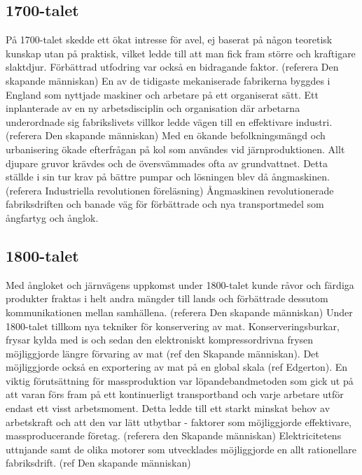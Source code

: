 \subsection{1700-talet}
På 1700-talet skedde ett ökat intresse för avel, ej baserat på någon teoretisk kunskap utan på praktisk, vilket ledde till att man fick fram större och kraftigare slaktdjur. Förbättrad utfodring var också en bidragande faktor. (referera Den skapande människan)
\newline
\newline
En av de tidigaste mekaniserade fabrikerna byggdes i England som nyttjade maskiner och arbetare på ett organiserat sätt. Ett inplanterade av en ny arbetsdisciplin och organisation där arbetarna underordnade sig fabrikslivets villkor ledde vägen till en effektivare industri. (referera Den skapande människan) 
\newline
\newline
Med en ökande befolkningsmängd och urbanisering ökade efterfrågan på kol som användes vid järnproduktionen. Allt djupare gruvor krävdes och de översvämmades ofta av grundvattnet. Detta ställde i sin tur krav på bättre pumpar och lösningen blev då ångmaskinen. 
(referera Industriella revolutionen föreläsning)
\newline
\newline
Ångmaskinen revolutionerade fabriksdriften och banade väg för förbättrade och nya transportmedel som ångfartyg och ånglok. 

\subsection{1800-talet}
Med ångloket och järnvägens uppkomst under 1800-talet kunde råvor och färdiga produkter fraktas i helt andra mängder till lands och förbättrade dessutom kommunikationen mellan samhällena. (referera Den skapande människan)
\newline
\newline
Under 1800-talet tillkom nya tekniker för konservering av mat. Konserveringsburkar, frysar kylda med is och sedan den elektroniskt kompressordrivna frysen möjliggjorde längre förvaring av mat (ref den Skapande människan). Det möjliggjorde också en exportering av mat på en global skala (ref Edgerton). 
\newline
\newline
En viktig förutsättning för massproduktion var löpandebandmetoden som gick ut på att varan förs fram på ett kontinuerligt transportband och varje arbetare utför endast ett visst arbetsmoment. Detta ledde till ett starkt minskat behov av arbetskraft och att den var lätt utbytbar - faktorer som möjliggjorde effektivare, massproducerande företag. (referera den Skapande människan) 
\newline
\newline
Elektricitetens uttnjande samt de olika motorer som utvecklades möjliggjorde en allt rationellare fabriksdrift. (ref Den skapande människan)

